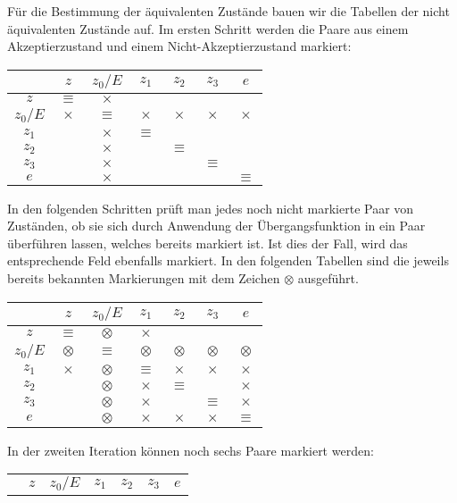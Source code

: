 \begin{loesung}
\begin{center}
\begin{tikzpicture}[>=latex,thick]
\end{tikzpicture}
\end{center}
Für die Bestimmung der äquivalenten Zustände bauen wir die Tabellen
der nicht äquivalenten Zustände auf. Im ersten Schritt werden die
Paare aus einem Akzeptierzustand und einem Nicht-Akzeptierzustand markiert:
\begin{center}
\begin{tabular}{|c|cccccc|}
\hline
&$z$&$z_0/E$&$z_1$&$z_2$&$z_3$&$e$\\
\hline
$z$&$\equiv$&$\times$&&&&\\
$z_0/E$&$\times$&$\equiv$&$\times$&$\times$&$\times$&$\times$\\
$z_1$&&$\times$&$\equiv$&&&\\
$z_2$&&$\times$&&$\equiv$&&\\
$z_3$&&$\times$&&&$\equiv$&\\
$e$&&$\times$&&&&$\equiv$\\
\hline
\end{tabular}
\end{center}
In den folgenden Schritten prüft man jedes noch nicht markierte Paar
von Zuständen, ob sie sich durch Anwendung der Übergangsfunktion
in ein Paar überführen lassen, welches bereits markiert ist. Ist dies
der Fall, wird das entsprechende Feld ebenfalls markiert. In den folgenden
Tabellen sind die jeweils bereits bekannten Markierungen mit dem Zeichen
$\otimes$ ausgeführt.
\begin{center}
\begin{tabular}{|c|cccccc|}
\hline
&$z$&$z_0/E$&$z_1$&$z_2$&$z_3$&$e$\\
\hline
$z$&$\equiv$&$\otimes$&$\times$&&&\\
$z_0/E$&$\otimes$&$\equiv$&$\otimes$&$\otimes$&$\otimes$&$\otimes$\\
$z_1$&$\times$&$\otimes$&$\equiv$&$\times$&$\times$&$\times$\\
$z_2$&&$\otimes$&$\times$&$\equiv$&&$\times$\\
$z_3$&&$\otimes$&$\times$&&$\equiv$&$\times$\\
$e$&&$\otimes$&$\times$&$\times$&$\times$&$\equiv$\\
\hline
\end{tabular}
\end{center}
In der zweiten Iteration können noch sechs Paare markiert werden:
\begin{center}
\begin{tabular}{|c|cccccc|}
\hline
&$z$&$z_0/E$&$z_1$&$z_2$&$z_3$&$e$\\

\end{tabular}
\end{center}
\end{loesung}
